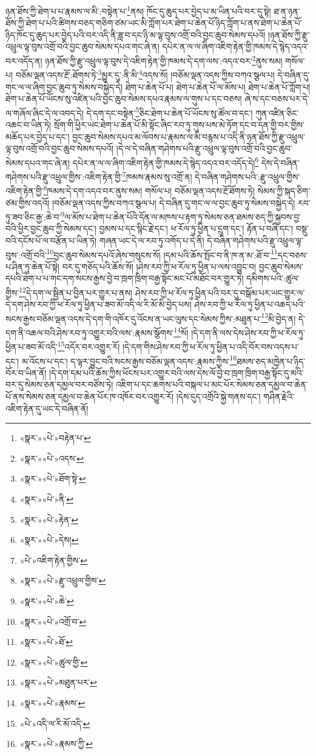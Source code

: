 ཉན་ཐོས་ཀྱི་ཐེག་པ་པ་རྣམས་ལ་མི་:བསྟེན་པ་\footnote{«སྣར་»«པེ་»བརྟེན་པ་}ནས། ཁོང་དུ་ཆུད་པར་བྱེད་པ་མ་ཡིན་པའི་བར་དུ་སྟེ། ཐ་ན་ཉན་ཐོས་ཀྱི་ཐེག་པ་པའི་ཚིགས་བཅད་གཅིག་ཙམ་ཡང་མི་ཀློག་པར་ཐེག་པ་ཆེན་པོ་ཉིད་ཀློག་པ་ནས་ཐེག་པ་ཆེན་པོ་ཉིད་ཁོང་དུ་ཆུད་པར་བྱེད་པའི་བར་འདི་ནི་ཟླ་བ་དང་ཉི་མ་ལྟ་བུས་འགྲོ་བའི་བྱང་ཆུབ་སེམས་དཔའོ། །ཉན་ཐོས་ཀྱི་རྫུ་འཕྲུལ་ལྟ་བུས་འགྲོ་བའི་བྱང་ཆུབ་སེམས་དཔའ་གང་ཞེ་ན། དཔེར་ན་ལ་ལ་ཞིག་འཇིག་རྟེན་གྱི་ཁམས་དེ་སྙེད་འདའ་བར་འདོད་ན། ཉན་ཐོས་ཀྱི་རྫུ་འཕྲུལ་ལྟ་བུས་དེ་འཇིག་རྟེན་གྱི་ཁམས་དེ་དག་ལས་:འདའ་བར་\footnote{«སྣར་»«པེ་»འདས་}ནུས་སམ། གསོལ་པ། བཅོམ་ལྡན་འདས་རྔོ་:ཐོགས་ཏེ་\footnote{«སྣར་»«པེ་»ཐོག་སྟེ་}མྱུར་དུ་:ནི་མི་\footnote{«སྣར་»«པེ་»ནི་}འདས་སོ། །བཅོམ་ལྡན་འདས་ཀྱིས་བཀའ་སྩལ་པ། དེ་བཞིན་དུ་གང་ལ་ལ་ཞིག་བྱང་ཆུབ་ཏུ་སེམས་བསྐྱེད་དེ། ཐེག་པ་ཆེན་པོ་པ། ཐེག་པ་ཆེན་པོ་ལ་མོས་པ། ཐེག་པ་ཆེན་པོ་ཀློག་པ། ཐེག་པ་ཆེན་པོ་ཡོངས་སུ་འཛིན་པའི་བྱང་ཆུབ་སེམས་དཔའ་རྣམས་ལ་གུས་པ་དང་བཅས། ཞེ་ས་དང་བཅས་པར་དེ་ལ་གཞོལ་ཞིང་དེ་ལ་འབད་དེ། དེ་དག་དང་བསྟེན་\footnote{«སྣར་»«པེ་»རྟེན་}ཅིང་ཐེག་པ་ཆེན་པོ་ཡོངས་སུ་ཚོལ་བ་དང་། ཀུན་འཛིན་ཅིང་འཆང་བ་ཡིན་ཏེ། སྲོག་གི་ཕྱིར་ཡང་ཐེག་པ་ཆེན་པོ་མི་སྟོང་ཞིང་རབ་ཏུ་གུས་པས་མེ་ཏོག་དང་བ་དན་གྱི་བར་གྱིས་མཆོད་པར་བྱེད་པ་དང་། བྱང་ཆུབ་སེམས་དཔའ་མ་ལོབས་པ་རྣམས་ལ་མི་བརྙས་པ་འདི་ནི་ཉན་ཐོས་ཀྱི་རྫུ་འཕྲུལ་ལྟ་བུས་འགྲོ་བའི་བྱང་ཆུབ་སེམས་དཔའོ། །དེ་ལ་དེ་བཞིན་གཤེགས་པའི་རྫུ་འཕྲུལ་ལྟ་བུས་འགྲོ་བའི་བྱང་ཆུབ་སེམས་དཔའ་གང་ཞེ་ན། དཔེར་ན་ལ་ལ་ཞིག་འཇིག་རྟེན་གྱི་ཁམས་དེ་སྙེད་འདའ་བར་འདོད་དེ།\footnote{«སྣར་»«པེ་»དེས།} དེས་དེ་བཞིན་གཤེགས་པའི་རྫུ་འཕྲུལ་གྱིས་:འཇིག་རྟེན་གྱི་\footnote{«པེ་»འཇིག་རྟེན་གྱིས་}ཁམས་རྣམས་སུ་འགྲོ་ན། དེ་བཞིན་གཤེགས་པའི་:རྫུ་འཕྲུལ་གྱིས་འཇིག་རྟེན་གྱི་\footnote{«སྣར་»«པེ་»རྫུ་འཕྲུལ་གྱིས་}ཁམས་དེ་དག་འདའ་བར་ནུས་སམ། གསོལ་པ། བཅོམ་ལྡན་འདས་རྔོ་ཐོགས་ཏེ། སེམས་ཀྱི་སྐད་ཅིག་ཙམ་གྱིས་འདའོ། །བཅོམ་ལྡན་འདས་ཀྱིས་བཀའ་སྩལ་པ། དེ་བཞིན་དུ་གང་ལ་ལ་བྱང་ཆུབ་ཏུ་སེམས་བསྐྱེད་དེ། རབ་ཏུ་ཟབ་ཅིང་རྒྱ་:ཆེ་བ་\footnote{«སྣར་»«པེ་»ཆེ་}ལ་མོས་པ་ཐེག་པ་ཆེན་པོའི་དོན་ལ་མཁས་པ་རྟག་ཏུ་སེམས་ཅན་ཐམས་ཅད་ཀྱི་སྐྱབས་བྱ་བའི་ཕྱིར་བྱང་ཆུབ་ཀྱི་སེམས་དང་། བྱམས་པ་དང་སྙིང་རྗེ་དང་། ཕ་རོལ་ཏུ་ཕྱིན་པ་དྲུག་དང་། རྟོན་པ་བཞི་དང་། བསྡུ་བའི་དངོས་པོ་ལ་བརྩོན་པ་ཡིན་ཏེ། གཞན་ཡང་དེ་ལ་རབ་ཏུ་འགོད་པ་དེ་ནི། དེ་བཞིན་གཤེགས་པའི་རྫུ་འཕྲུལ་ལྟ་བུས་:འགྲོ་བའི་\footnote{«སྣར་»«པེ་»འགྲོ་བ་}བྱང་ཆུབ་སེམས་དཔའོ་ཞེས་གསུངས་སོ། །དམ་པའི་ཆོས་སྤོང་བ་ནི་ཁ་ན་མ་:ཐོ་བ་\footnote{«སྣར་»«པེ་»ཐོ་}དང་བཅས་པ་ཤིན་ཏུ་ཆེན་པོ་སྟེ། བར་དུ་གཅོད་པའི་ཆོས་སོ། །ཤེས་རབ་ཀྱི་ཕ་རོལ་ཏུ་ཕྱིན་པ་ལས་འབྱུང་བ། བྱང་ཆུབ་སེམས་དཔའི་ཐེག་པ་པ་གང་དག་སངས་རྒྱས་བྱེ་བ་ཁྲག་ཁྲིག་བརྒྱ་སྟོང་མང་པོ་མཐོང་བར་གྱུར་ཏེ། དམིགས་པའི་:ཚུལ་གྱིས་\footnote{«སྣར་»«པེ་»ཚུལ་གྱི་}དེ་དག་ལ་སྦྱིན་པ་བྱིན་པར་གྱུར་པ་ནས། ཤེས་རབ་ཀྱི་ཕ་རོལ་ཏུ་ཕྱིན་པའི་བར་དུ་བསྒོམ་པར་ཡང་གྱུར་ལ་དེ་དག་ཤེས་རབ་ཀྱི་ཕ་རོལ་ཏུ་ཕྱིན་པ་ཟབ་མོ་འདི་ལ་རི་མོ་མི་བྱེད་པས། ཤེས་རབ་ཀྱི་ཕ་རོལ་ཏུ་ཕྱིན་པ་འཆད་པའི་སངས་རྒྱས་བཅོམ་ལྡན་འདས་དེ་དག་གི་འཁོར་དུ་འོངས་ན་ཡང་ལུས་དང་སེམས་ཀྱིས་:མཐུན་པ་\footnote{«སྣར་»«པེ་»མཐུན་པར་}མི་བྱེད་ན། དེ་དག་ནི་འཆལ་བའི་ཤེས་རབ་ཏུ་འགྱུར་བའི་ལས་:རྣམས་སྩོགས་\footnote{«སྣར་»«པེ་»རྣམས་}སོ། །དེ་དག་ནི་ལས་དེས་ཤེས་རབ་ཀྱི་ཕ་རོལ་ཏུ་ཕྱིན་པ་ཟབ་མོ་འདི་\footnote{«པེ་»འདི་ལ་རི་མོ་འདི་}འདོར་བར་འགྱུར་རོ། །དེ་དག་གིས་ཤེས་རབ་ཀྱི་ཕ་རོལ་ཏུ་ཕྱིན་པ་འདི་བོར་བས་འདས་པ་དང་། མ་འོངས་པ་དང་། ད་ལྟར་བྱུང་བའི་སངས་རྒྱས་བཅོམ་ལྡན་འདས་:རྣམས་ཀྱིས་\footnote{«སྣར་»«པེ་»རྣམས་ཀྱི་}ཐམས་ཅད་མཁྱེན་པ་ཉིད་བོར་བ་ཡིན་ནོ། །དེ་དག་དམ་པའི་ཆོས་ཀྱིས་ཕོངས་པར་འགྱུར་བའི་ལས་དེས་ལོ་བྱེ་བ་ཁྲག་ཁྲིག་བརྒྱ་སྟོང་དུ་མའི་བར་དུ་སེམས་ཅན་དམྱལ་བར་བཙོས་ཏེ། འཇིག་པ་དང་ཆགས་པའི་བསྐལ་པ་མང་པོར་སེམས་ཅན་དམྱལ་བ་ཆེན་པོ་ནས་སེམས་ཅན་དམྱལ་བ་ཆེན་པོར་ཁ་འཁོར་བར་འགྱུར་རོ། །དེས་དུད་འགྲོའི་སྐྱེ་གནས་དང་། གཤིན་རྗེའི་འཇིག་རྟེན་དུ་ཡང་དེ་བཞིན་ནོ། 